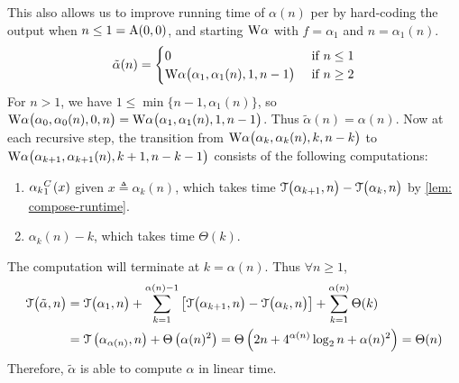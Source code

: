 This also allows us to improve running time of $\alpha(n)$ per  by hard-coding the output when $n\le 1 = \text{A}(0, 0)$, and starting $\text{W}\alpha$ with $f = \alpha_1$ and $n = \alpha_1(n)$.
\begin{equation*}
\tilde{\alpha}(n) = \begin{cases}
0 & \text{ if } n \le 1 \\ \text{W}\alpha\big(\alpha_1, \alpha_1(n), 1, n-1\big) & \text{ if } n \ge 2
\end{cases}
\end{equation*}
For $n > 1$, we have $1\le \min\big\{n-1, \alpha_1(n)\big\}$, so $
\text{W}\alpha\big(\alpha_0, \alpha_0(n), 0, n\big) =
\text{W}\alpha\big(\alpha_1, \alpha_1(n), 1, n-1\big)$.
Thus $\tilde{\alpha}(n) = \alpha(n)$. Now at each recursive step, the transition from $\text{W}\alpha\big(\alpha_k, \alpha_k(n), k, n-k\big)$ to $\text{W}\alpha\big(\alpha_{k+1}, \alpha_{k+1}(n), k+1, n-k-1\big)$ consists of the following computations:
 \begin{enumerate}[label={(\arabic*)}]
	\item $\cdt{\alpha_k}{1}(x)$ given $x\triangleq \alpha_k(n)$, which takes time $\mathcal{T}\big(\alpha_{k+1}, n\big) - \mathcal{T}\big(\alpha_k, n\big)$ by \cref{lem: compose-runtime}.
	\item $\alpha_k(n) - k$, which takes time $\Theta(k)$.
\end{enumerate}
The computation will terminate at $k = \alpha(n)$. Thus $\forall n\ge 1$,
\begin{equation} \label{eq: inv-ack-runtime-improved}
\begin{aligned}
\mathcal{T}\big(\tilde{\alpha}, n\big) & = \mathcal{T}\big(\alpha_1, n\big) + \sum_{k=1}^{\alpha(n) - 1}
\left[ \mathcal{T}\big(\alpha_{k+1}, n\big) - \mathcal{T}\big(\alpha_k, n\big)
\right] + \sum_{k=1}^{\alpha(n)}\Theta(k) \\
& = \mathcal{T}\left(\alpha_{\alpha(n)}, n\right) + \Theta\left(\alpha(n)^2\right)
= \Theta\left(2n + 4^{\alpha(n)}\log_2n + \alpha(n)^2\right) = \Theta(n)
\end{aligned}
\end{equation}
Therefore, $\tilde{\alpha}$ is able to compute $\alpha$ in linear time.
